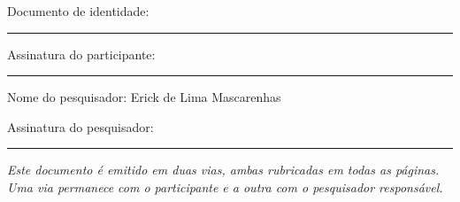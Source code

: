 \documentclass[12pt,a4paper]{article}
\newcommand{\linha}[1]{\rule{#1}{0.4pt}}
\begin{document}
\noindent Documento de identidade: \linha{6cm}

\vspace{22pt}

\noindent Assinatura do participante: \linha{9cm}

\vspace{26pt}

\noindent Nome do pesquisador: Erick de Lima Mascarenhas

\vspace{22pt}

\noindent Assinatura do pesquisador: \linha{9cm}

\vspace{16pt}

\begin{center}
\small\textit{Este documento é emitido em duas vias, ambas rubricadas em todas as
páginas. Uma via permanece com o participante e a outra com o pesquisador
responsável.}
\end{center}
\end{document}

